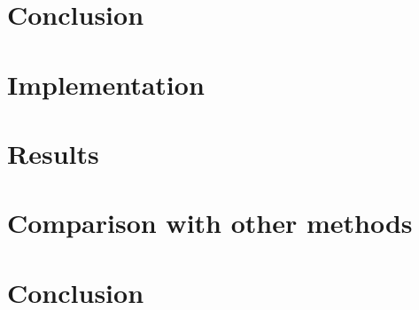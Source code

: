 \documentclass[10pt,twoside,a4paper]{article}
\begin{document}
\section{Conclusion}\label{sec:conclusion}
\cite{BL22}
\cite{CHF20}
\cite{KLL+19}
\cite{LRGC22}
\cite{NMBP20}
\section{Implementation}\label{sec:implementation}
\section{Results}\label{sec:results}
\section{Comparison with other methods}\label{sec:comparison}
\section{Conclusion}\label{sec:conclusion}



\end{document}
